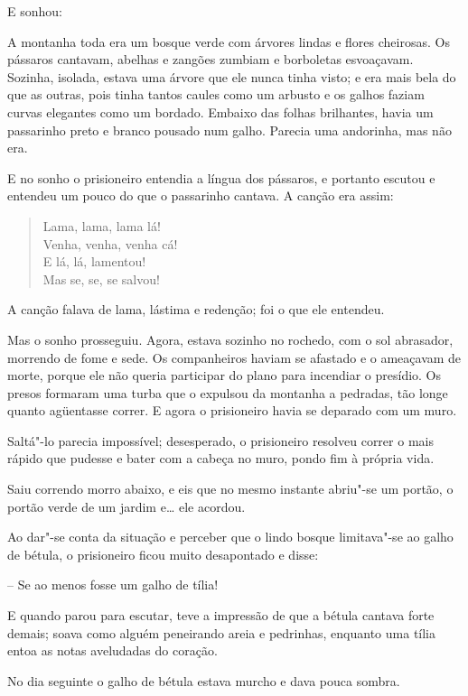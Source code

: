 E sonhou:

A montanha toda era um bosque verde com árvores lindas e flores
cheirosas. Os pássaros cantavam, abelhas e zangões zumbiam e borboletas
esvoaçavam. Sozinha, isolada, estava uma árvore que ele nunca tinha
visto; e era mais bela do que as outras, pois tinha tantos caules como
um arbusto e os galhos faziam curvas elegantes como um bordado. Embaixo
das folhas brilhantes, havia um passarinho preto e branco pousado num
galho. Parecia uma andorinha, mas não era.

E no sonho o prisioneiro entendia a língua dos pássaros, e portanto
escutou e entendeu um pouco do que o passarinho cantava. A canção era
assim: 
\begin{verse}
Lama, lama, lama lá!\\ 
Venha, venha, venha cá!\\ 
E lá, lá, lamentou!\\ 
Mas se, se, se salvou!\\
\end{verse}

A canção falava de lama, lástima e redenção; foi o que ele entendeu.

Mas o sonho prosseguiu. Agora, estava sozinho no rochedo, com o sol
abrasador, morrendo de fome e sede. Os companheiros haviam se afastado
e o ameaçavam de morte, porque ele não queria participar do plano para
incendiar o presídio. Os presos formaram uma turba que o expulsou da
montanha a pedradas, tão longe quanto agüentasse correr. E agora o
prisioneiro havia se deparado com um muro.

Saltá"-lo parecia impossível; desesperado, o prisioneiro resolveu
correr o mais rápido que pudesse e bater com a cabeça no muro, pondo
fim à própria vida.

Saiu correndo morro abaixo, e eis que no mesmo instante abriu"-se um
portão, o portão verde de um jardim e\ldots{} ele acordou.

Ao dar"-se conta da situação e perceber que o lindo bosque
limitava"-se ao galho de bétula, o prisioneiro ficou muito desapontado
e disse:

-- Se ao menos fosse um galho de tília!

E quando parou para escutar, teve a impressão de que a bétula cantava
forte demais; soava como alguém peneirando areia e pedrinhas, enquanto
uma tília entoa as notas aveludadas do coração.

No dia seguinte o galho de bétula estava murcho e dava pouca sombra.

